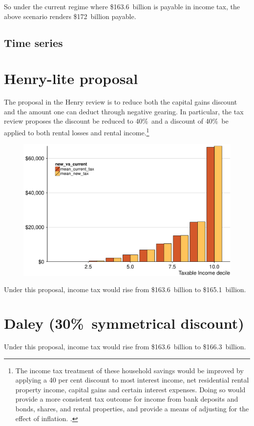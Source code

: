 \documentclass{grattan}\usepackage[]{graphicx}\usepackage[]{color}
\begin{document}
So under the current regime where \$163.6~billion is payable in income tax, the above scenario renders \$172~billion payable.
\clearpage


\subsection{Time series}





\section{Henry-lite proposal}
The proposal in the Henry review is to reduce both the capital gains discount and the amount one can deduct through negative gearing. In particular, the tax review proposes the discount be reduced to 40\%\ and a discount of 40\%\ be applied to both rental losses and rental income.\footnote{The income tax treatment of these household savings would be improved by applying a
40 per cent discount to most interest income, net residential rental property income, capital
gains and certain interest expenses. Doing so would provide a more consistent tax
outcome for income from bank deposits and bonds, shares, and rental properties, and
provide a means of adjusting for the effect of inflation. \textcite{Treasury2010a}.}




\begin{figure}
\includegraphics[width=\columnwidth]{figure/Henry_proposal_change_in_tax_burden_by_decile-1}
\notes{}

\source{}
\end{figure}

Under this proposal, income tax would rise from \$163.6~billion to \$165.1~billion.

\section{Daley (30\%\ symmetrical discount)}

Under this proposal, income tax would rise from \$163.6~billion to \$166.3~billion.







\printbibliography
\end{document}
